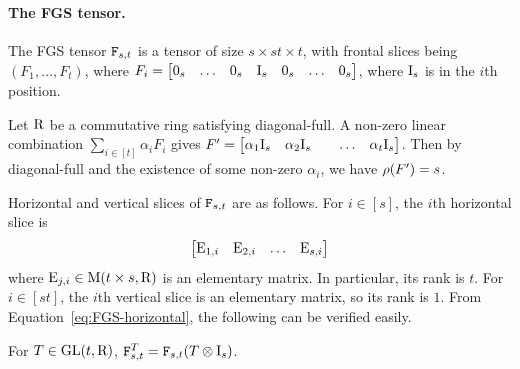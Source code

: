 \paragraph{The FGS tensor.} The FGS tensor $\mathtt{F}_{s, t}$ is a tensor of size $s\times st\times t$, with frontal slices being $(F_1, \dots, F_t)$, where $F_i=\begin{bmatrix}
	0_s & \dots & 0_s & \mathrm{I}_s & 0_s & \dots & 0_s 
\end{bmatrix}$, where $\mathrm{I}_s$ is in the $i$th position. 

Let $\mathrm{R}$ be a commutative ring satisfying diagonal-full. A non-zero linear combination $\sum_{i\in[t]}\alpha_i F_i$ gives $F'=\begin{bmatrix}
	\alpha_1\mathrm{I}_s & \alpha_2\mathrm{I}_s & & \dots & \alpha_t\mathrm{I}_s 
\end{bmatrix}$. Then by diagonal-full and the existence of some non-zero $\alpha_i$, we have $\rho(F')=s$.

Horizontal and vertical slices of $\mathtt{F}_{s, t}$ are as follows. For $i\in [s]$, the $i$th horizontal slice is 
\begin{equation}\label{eq:FGS-horizontal}
\begin{bmatrix}
	\mathrm{E}_{1, i} & \mathrm{E}_{2, i} & \dots & \mathrm{E}_{s, i}
\end{bmatrix}
\end{equation}
where $\mathrm{E}_{j, i}\in \mathrm{M}(t\times s, \mathrm{R})$ is an elementary matrix. In particular, its rank is $t$. For $i\in[st]$, the $i$th vertical slice is an elementary matrix, so its rank is $1$. From Equation~\ref{eq:FGS-horizontal}, the following can be verified easily.
\begin{fact}\label{fact:FGS-tensor}
	For $T\in \mathrm{GL}(t, \mathrm{R})$, $\mathtt{F}_{s, t}^T=\mathtt{F}_{s, t} (T\otimes \mathrm{I}_s)$.
\end{fact}
 

